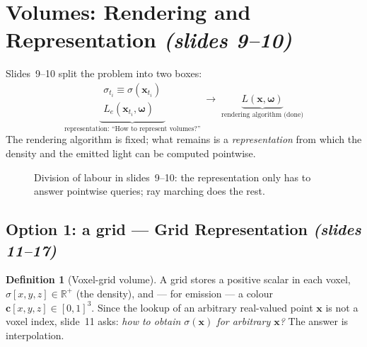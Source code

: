 \documentclass[11pt,a4paper]{article}
\newcommand{\sref}[1]{\texorpdfstring{\emph{(slides #1)}}{(slides #1)}}
\newcommand{\R}{\mathbb{R}}
\newcommand{\om}{\boldsymbol{\omega}}
\newcommand{\cc}{\boldsymbol{c}}
\newcommand{\xx}{\boldsymbol{x}}
\newcommand{\Le}{L_e}
\theoremstyle{definition}
\newtheorem{definition}{Definition}[section]
\theoremstyle{plain}
\theoremstyle{remark}
\begin{document}
\section{Volumes: Rendering and Representation \sref{9--10}}

Slides~9--10 split the problem into two boxes:
\[
\underbrace{\begin{matrix}\sigma_{t_i}\equiv\sigma(\xx_{t_i})\\ \Le(\xx_{t_i},\om)\end{matrix}}_{\text{representation: ``How to represent volumes?''}}
\;\longrightarrow\;
\underbrace{L(\xx,\om)}_{\text{rendering algorithm (done)}}
\]
The rendering algorithm is fixed; what remains is a \emph{representation} from which the density and the emitted light can be computed pointwise.


\begin{figure}[H]
\centering
{}
\caption{Division of labour in slides~9--10: the representation only has to answer pointwise queries; ray marching does the rest.}
\end{figure}

\subsection{Option 1: a grid --- Grid Representation \sref{11--17}}

\begin{definition}[Voxel-grid volume]
A grid stores a positive scalar in each voxel, $\sigma[x,y,z]\in\R^+$ (the density), and --- for emission --- a colour $\cc[x,y,z]\in[0,1]^3$. Since the lookup of an arbitrary real-valued point $\xx$ is not a voxel index, slide~11 asks: \emph{how to obtain $\sigma(\xx)$ for arbitrary $\xx$?} The answer is interpolation.
\end{definition}
\end{document}

